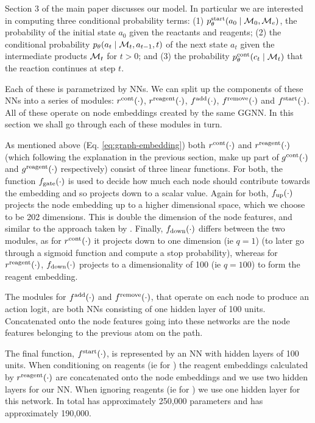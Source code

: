 Section 3 of the main paper discusses our model.
In particular we are interested in computing three conditional probability terms: (1) $p_\theta^{\mathrm{start}}(a_0 \mid {\mathcal{M}}_0, {\mathcal{M}}_e)$, the probability of the initial state $a_0$ given the reactants and reagents; 
(2) the conditional probability $p_\theta(a_t \mid {\mathcal{M}}_t, a_{t-1}, t)$  
of the next state $a_t$ given the intermediate products ${\mathcal{M}}_t$ for $t > 0$;
and (3) the probability $p_\theta^{\mathrm{cont}}(c_{t} \mid {\mathcal{M}}_{t})$ that the reaction continues at step $t$.

Each of these is parametrized by NNs. We can split up the components of these NNs into a series of modules: $r^{\textrm{cont}}(\cdot)$, $r^{\textrm{reagent}}(\cdot)$, $f^{\textrm{add}}(\cdot)$, $f^{\textrm{remove}}(\cdot)$ and $f^{\textrm{start}}(\cdot)$. 
All of these operate on node embeddings created by the same GGNN.
 In this section we shall go through each of these modules in turn.




As mentioned above (Eq. \ref{eq:graph-embedding}) both $r^{\textrm{cont}}(\cdot)$ and $r^{\textrm{reagent}}(\cdot)$ (which following the explanation in the previous section, make up part of $g^{\textrm{cont}}(\cdot)$ and $g^{\textrm{reagent}}(\cdot)$ respectively) consist of three
linear functions. 
For  both, the function $f_\textrm{gate}(\cdot)$ is used to decide how much each node should contribute towards the embedding and so projects down to a scalar value.
Again for both, $f_\textrm{up}(\cdot)$ projects the node embedding up to a higher dimensional space, which we choose to be 202 dimensions. 
This is double the dimension of the node features, and similar to the approach taken by \citet[\S B.1]{li2018learning}.
Finally, $f_\textrm{down}(\cdot)$ differs between the two modules, as for $r^{\textrm{cont}}(\cdot)$ it projects down to one dimension (ie $q=1$) (to later go through a sigmoid function and compute a stop probability), whereas for  $r^{\textrm{reagent}}(\cdot)$, $f_\textrm{down}(\cdot)$ projects  to a dimensionality of 100 (ie $q=100$) to form the reagent embedding.


The modules for $f^{\textrm{add}}(\cdot)$ and $f^{\textrm{remove}}(\cdot)$, that operate on each node to produce an action logit, are both NNs consisting of one hidden layer of 100 units. 
Concatenated onto the node features going into these networks are the node features belonging to the previous atom on the path.



The final function, $f^{\textrm{start}}(\cdot)$, is represented by an NN with hidden layers of 100 units. 
When conditioning on reagents (ie for
 \ourModelR
 )
  the reagent embeddings calculated by $r^{\textrm{reagent}}(\cdot)$ are concatenated onto the node embeddings and we use two hidden layers for our NN. When ignoring reagents (ie for \ourModelIR) we use one hidden layer for this network. In total \ourModelR has approximately 250,000 parameters and \ourModelIR has approximately 190,000.

